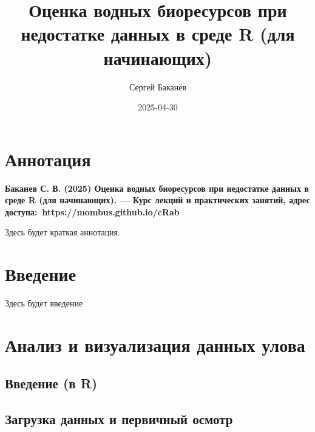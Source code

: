 \documentclass[
  letterpaper,
  DIV=11,
  numbers=noendperiod]{scrreprt}
\title{Оценка водных биоресурсов при недостатке данных в среде R (для
начинающих)}
\author{Сергей Баканёв}
\date{2025-04-30}
\renewcommand*\contentsname{Table of contents}
\newcommand\contentsname{Table of contents}
\begin{document}
\maketitle

\renewcommand*\contentsname{Table of contents}
{
\hypersetup{linkcolor=}
\setcounter{tocdepth}{2}
\tableofcontents
}


\chapter*{Аннотация}\label{ux430ux43dux43dux43eux442ux430ux446ux438ux44f}


\textbf{Баканев С. В. (2025) Оценка водных биоресурсов при недостатке
данных в среде R (для начинающих). --- Курс лекций и практических
занятий, адрес доступа:~https://mombus.github.io/cRab}

Здесь будет краткая аннотация.


\chapter{Введение}\label{ux432ux432ux435ux434ux435ux43dux438ux435}

Здесь будет введение


\chapter{Анализ и визуализация данных
улова}\label{ux430ux43dux430ux43bux438ux437-ux438-ux432ux438ux437ux443ux430ux43bux438ux437ux430ux446ux438ux44f-ux434ux430ux43dux43dux44bux445-ux443ux43bux43eux432ux430}

\section{Введение (в
R)}\label{ux432ux432ux435ux434ux435ux43dux438ux435-ux432-r}

\section{Загрузка данных и первичный
осмотр}\label{ux437ux430ux433ux440ux443ux437ux43aux430-ux434ux430ux43dux43dux44bux445-ux438-ux43fux435ux440ux432ux438ux447ux43dux44bux439-ux43eux441ux43cux43eux442ux440}
\end{document}
